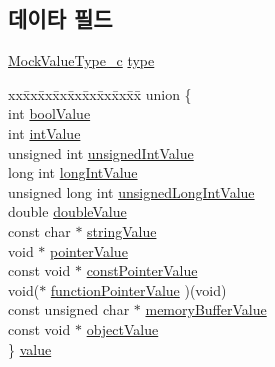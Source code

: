 \subsection*{데이타 필드}
\begin{DoxyCompactItemize}
\item 
\hyperlink{_mock_support__c_8h_a6770f23769783db30dbb9a44570c4497}{Mock\+Value\+Type\+\_\+c} \hyperlink{struct_s_mock_value__c_a264c0dbbb2fed64824fc5d5a17786d7d}{type}
\item 
\begin{tabbing}
xx\=xx\=xx\=xx\=xx\=xx\=xx\=xx\=xx\=\kill
union \{\\
\>int \hyperlink{struct_s_mock_value__c_a22ded2e46e47857bd6eb5778576a326a}{boolValue}\\
\>int \hyperlink{struct_s_mock_value__c_a23b7c31b2f6c188e1c281f7be7473f23}{intValue}\\
\>unsigned int \hyperlink{struct_s_mock_value__c_a425a71424f07e5dd3c427e80e0b65d0d}{unsignedIntValue}\\
\>long int \hyperlink{struct_s_mock_value__c_a28fbf806ad57d0f25df940b217bd1416}{longIntValue}\\
\>unsigned long int \hyperlink{struct_s_mock_value__c_acedede3a0350c500d29fa777023a2272}{unsignedLongIntValue}\\
\>double \hyperlink{struct_s_mock_value__c_a7bc845542bdc79ff87d50b7c40a069f2}{doubleValue}\\
\>const char $\ast$ \hyperlink{struct_s_mock_value__c_ac681defebf85c29e3a3e79d944ce005a}{stringValue}\\
\>void $\ast$ \hyperlink{struct_s_mock_value__c_a2ce1b3b8967c64ad0f491d7b119c5d34}{pointerValue}\\
\>const void $\ast$ \hyperlink{struct_s_mock_value__c_acc3a4d41d629789321124f6d156241a2}{constPointerValue}\\
\>void($\ast$ \hyperlink{struct_s_mock_value__c_a04eefaf984b7d689bcd2cf4cfd25bff7}{functionPointerValue} )(void)\\
\>const unsigned char $\ast$ \hyperlink{struct_s_mock_value__c_aa2c11bfcf011fe08c667cfb10a4a7b61}{memoryBufferValue}\\
\>const void $\ast$ \hyperlink{struct_s_mock_value__c_a7bad589b252a4ec87473ea7e139e6d3b}{objectValue}\\
\} \hyperlink{struct_s_mock_value__c_a22bb9352683f0925da341951892bcfda}{value}\\

\end{tabbing}\end{DoxyCompactItemize}


